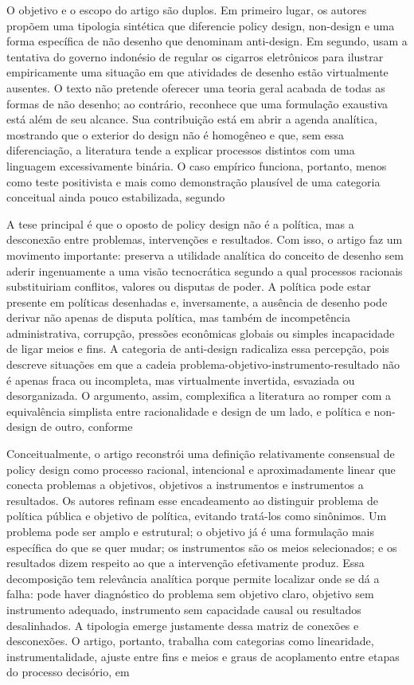 \documentclass[12pt,a4paper]{article}
\begin{document}
O objetivo e o escopo do artigo são duplos. Em primeiro lugar, os autores propõem uma tipologia sintética que diferencie policy design, non-design e uma forma específica de não desenho que denominam anti-design. Em segundo, usam a tentativa do governo indonésio de regular os cigarros eletrônicos para ilustrar empiricamente uma situação em que atividades de desenho estão virtualmente ausentes. O texto não pretende oferecer uma teoria geral acabada de todas as formas de não desenho; ao contrário, reconhece que uma formulação exaustiva está além de seu alcance. Sua contribuição está em abrir a agenda analítica, mostrando que o exterior do design não é homogêneo e que, sem essa diferenciação, a literatura tende a explicar processos distintos com uma linguagem excessivamente binária. O caso empírico funciona, portanto, menos como teste positivista e mais como demonstração plausível de uma categoria conceitual ainda pouco estabilizada, segundo\parencite{newman2020_policy_design}

A tese principal é que o oposto de policy design não é a política, mas a desconexão entre problemas, intervenções e resultados. Com isso, o artigo faz um movimento importante: preserva a utilidade analítica do conceito de desenho sem aderir ingenuamente a uma visão tecnocrática segundo a qual processos racionais substituiriam conflitos, valores ou disputas de poder. A política pode estar presente em políticas desenhadas e, inversamente, a ausência de desenho pode derivar não apenas de disputa política, mas também de incompetência administrativa, corrupção, pressões econômicas globais ou simples incapacidade de ligar meios e fins. A categoria de anti-design radicaliza essa percepção, pois descreve situações em que a cadeia problema-objetivo-instrumento-resultado não é apenas fraca ou incompleta, mas virtualmente invertida, esvaziada ou desorganizada. O argumento, assim, complexifica a literatura ao romper com a equivalência simplista entre racionalidade e design de um lado, e política e non-design de outro, conforme\parencite{newman2020_policy_design}

Conceitualmente, o artigo reconstrói uma definição relativamente consensual de policy design como processo racional, intencional e aproximadamente linear que conecta problemas a objetivos, objetivos a instrumentos e instrumentos a resultados. Os autores refinam esse encadeamento ao distinguir problema de política pública e objetivo de política, evitando tratá-los como sinônimos. Um problema pode ser amplo e estrutural; o objetivo já é uma formulação mais específica do que se quer mudar; os instrumentos são os meios selecionados; e os resultados dizem respeito ao que a intervenção efetivamente produz. Essa decomposição tem relevância analítica porque permite localizar onde se dá a falha: pode haver diagnóstico do problema sem objetivo claro, objetivo sem instrumento adequado, instrumento sem capacidade causal ou resultados desalinhados. A tipologia emerge justamente dessa matriz de conexões e desconexões. O artigo, portanto, trabalha com categorias como linearidade, instrumentalidade, ajuste entre fins e meios e graus de acoplamento entre etapas do processo decisório, em\parencite{newman2020_policy_design}
\end{document}
